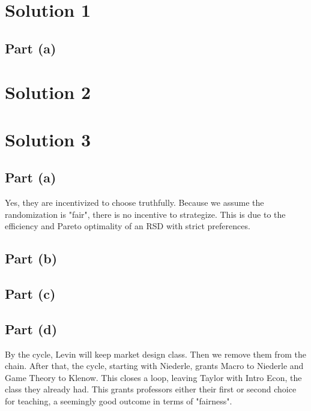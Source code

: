 \documentclass[10pt,a4paper]{article}
\begin{document}
\section*{Solution 1}
  \subsection*{Part (a)}
       

\section*{Solution 2}

\section*{Solution 3}
  \subsection*{Part (a)}
    Yes, they are incentivized to choose truthfully. Because we assume the randomization is "fair", there is no incentive to strategize. This is due to the efficiency and Pareto optimality of an RSD with strict preferences.
  \subsection*{Part (b)}

  \subsection*{Part (c)}
    
  \subsection*{Part (d)}
    By the cycle, Levin will keep market design class. Then we remove them from the chain. After that, the cycle, starting with Niederle, grants Macro to Niederle and Game Theory to Klenow. This closes a loop, leaving Taylor with Intro Econ, the class they already had. This grants professors either their first or second choice for teaching, a seemingly good outcome in terms of "fairness".
\end{document}
